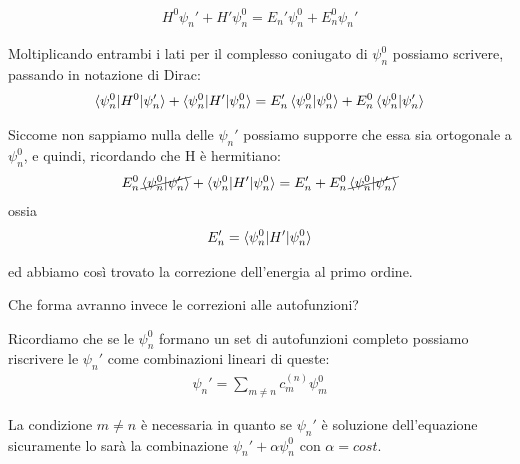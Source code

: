 \begin{align}
H^0\psi_n' + H'\psi_n^0= E_n'\psi_n^0 + E_n^0\psi_n' 
\end{align}

Moltiplicando entrambi i lati per il complesso coniugato di $\psi_n^0$ possiamo scrivere, passando in notazione di Dirac:
\begin{align}
\braket{\psi_n^0 |H^0|\psi_n'} + \braket{\psi_n^0 |H'|\psi_n^0} = E_n'\braket{\psi_n^0|\psi_n^0} + E_n^0 \braket{\psi_n^0|\psi_n'}
\end{align}

Siccome non sappiamo nulla delle $\psi_n'$ possiamo supporre che essa sia ortogonale a $\psi_n^0$, e quindi, ricordando che H è hermitiano:
\begin{align}
E_n^0 \, \cancel{\braket{\psi_n^0 |\psi_n'}}+ \braket{\psi_n^0 |H'|\psi_n^0}= E_n' + E_n^0 \, \cancel{\braket{\psi_n^0 |\psi_n'}}
\end{align}
ossia
\begin{align}
E_n'=\braket{\psi_n^0 |H'|\psi_n^0}
\end{align}

ed abbiamo così trovato la correzione dell'energia  al primo ordine.

Che forma avranno invece le correzioni alle autofunzioni?

Ricordiamo che se le $\psi_n^0$ formano un set di autofunzioni completo possiamo riscrivere le $\psi_n'$ come combinazioni lineari di queste:
\begin{align}
\psi_n'= \sum_{m\neq n}c_m^{(n)}\psi_m^0
\end{align}

La condizione $m\neq n$ è necessaria in quanto se $\psi_n'$ è soluzione dell'equazione sicuramente lo sarà la combinazione $\psi_n' + \alpha \psi_n^0$ con $\alpha=cost.$

